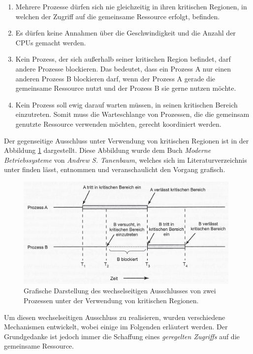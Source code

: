 				\begin{enumerate}
					\item Mehrere Prozesse dürfen sich nie gleichzeitig in ihren kritischen Regionen, in welchen der Zugriff auf die gemeinsame Ressource erfolgt, befinden.
					\item Es dürfen keine Annahmen über die Geschwindigkeit und die Anzahl der CPUs gemacht werden.
					\item Kein Prozess, der sich außerhalb seiner kritischen Region befindet, darf andere Prozesse blockieren. Das bedeutet, dass ein Prozess A nur einen anderen Prozess B blockieren darf, wenn der Prozess A gerade die gemeinsame Ressource nutzt und der Prozess B sie gerne nutzen möchte.
					\item Kein Prozess soll ewig darauf warten müssen, in seinen kritischen Bereich einzutreten. Somit muss die Warteschlange von Prozessen, die die gemeinsam genutzte Ressource verwenden möchten, gerecht koordiniert werden. \cite{ModerneBetriebssysteme}
				\end{enumerate}
				
				Der gegenseitige Ausschluss unter Verwendung von kritischen Regionen ist in der Abbildung \ref{fig:MutexKritischeRegionen} dargestellt. Diese Abbildung wurde dem Buch \textit{Moderne Betriebssysteme} von \textit{Andrew S. Tanenbaum}, welches sich im Literaturverzeichnis unter \cite{ModerneBetriebssysteme} finden lässt, entnommen und veranschaulicht den Vorgang grafisch.
				
				\begin{figure}
					\centering	
					\includegraphics[width=11cm]{Abbildungen/Mutex_kritische_Regionen.jpg}
					\caption{Grafische Darstellung des wechselseitigen Ausschlusses von zwei Prozessen unter der Verwendung von kritischen Regionen.}
					\label{fig:MutexKritischeRegionen}
				\end{figure}
				
				Um diesen wechselseitigen Ausschluss zu realisieren, wurden verschiedene Mechanismen entwickelt, wobei einige im Folgenden erläutert werden. Der Grundgedanke ist jedoch immer die Schaffung eines \textit{geregelten Zugriffs} auf die gemeinsame Ressource. \cite{ModerneBetriebssysteme}\\
				

